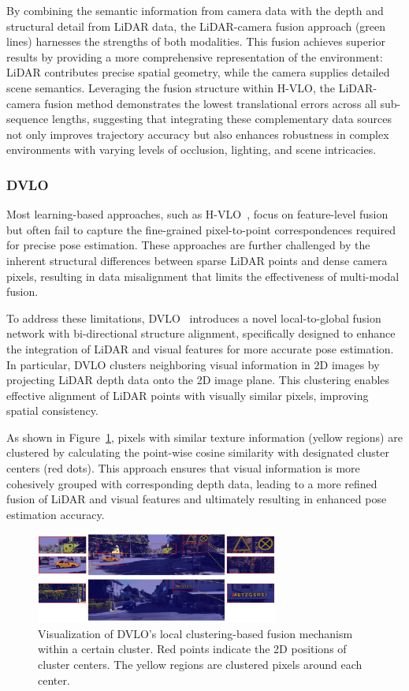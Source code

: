 \documentclass[11pt,a4paper]{article}
\begin{document}
By combining the semantic information from camera data with the depth and structural detail from LiDAR data, the LiDAR-camera fusion approach (green lines) harnesses the strengths of both modalities. This fusion achieves superior results by providing a more comprehensive representation of the environment: LiDAR contributes precise spatial geometry, while the camera supplies detailed scene semantics. Leveraging the fusion structure within H-VLO, the LiDAR-camera fusion method demonstrates the lowest translational errors across all sub-sequence lengths, suggesting that integrating these complementary data sources not only improves trajectory accuracy but also enhances robustness in complex environments with varying levels of occlusion, lighting, and scene intricacies.

\subsubsection{DVLO}
Most learning-based approaches, such as H-VLO~\cite{hvlo}, focus on feature-level fusion but often fail to capture the fine-grained pixel-to-point correspondences required for precise pose estimation. These approaches are further challenged by the inherent structural differences between sparse LiDAR points and dense camera pixels, resulting in data misalignment that limits the effectiveness of multi-modal fusion.

To address these limitations, DVLO~\cite{dvlo} introduces a novel local-to-global fusion network with bi-directional structure alignment, specifically designed to enhance the integration of LiDAR and visual features for more accurate pose estimation. In particular, DVLO clusters neighboring visual information in 2D images by projecting LiDAR depth data onto the 2D image plane. This clustering enables effective alignment of LiDAR points with visually similar pixels, improving spatial consistency.

As shown in Figure~\ref{fig:dvlo}, pixels with similar texture information (yellow regions) are clustered by calculating the point-wise cosine similarity with designated cluster centers (red dots). This approach ensures that visual information is more cohesively grouped with corresponding depth data, leading to a more refined fusion of LiDAR and visual features and ultimately resulting in enhanced pose estimation accuracy.

\begin{figure}[htbp]
    \centering
    \includegraphics[width=8cm]{Reports/3-Analysis-of-Baselines/images/dvlo.png}
    \caption{Visualization of DVLO's local clustering-based fusion mechanism within a certain cluster. Red points indicate the 2D positions of cluster centers. The yellow regions are clustered pixels around each center.}
    \label{fig:dvlo}
\end{figure}
\end{document}
